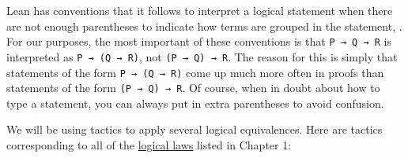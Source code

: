 \documentclass[
  letterpaper,
  DIV=11,
  numbers=noendperiod]{scrreprt}
\theoremstyle{remark}
\begin{document}
Lean has conventions that it follows to interpret a logical statement
when there are not enough parentheses to indicate how terms are grouped
in the statement, . For our purposes, the most important of these
conventions is that \texttt{P\ →\ Q\ →\ R} is interpreted as
\texttt{P\ →\ (Q\ →\ R)}, not \texttt{(P\ →\ Q)\ →\ R}. The reason for
this is simply that statements of the form \texttt{P\ →\ (Q\ →\ R)} come
up much more often in proofs than statements of the form
\texttt{(P\ →\ Q)\ →\ R}. Of course, when in doubt about how to type a
statement, you can always put in extra parentheses to avoid confusion.

We will be using tactics to apply several logical equivalences. Here are
tactics corresponding to all of the
\protect\hyperlink{prop-laws}{logical laws} listed in Chapter 1:
\end{document}
